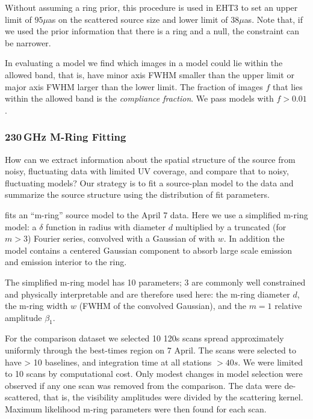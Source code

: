 Without assuming a ring prior, this procedure is used in EHT3  to set an upper limit of $95\mu$as on
the scattered source size and lower limit of $38\mu$as.
Note that, if we used the prior information that there is a ring and a null, the constraint can be narrower.

In evaluating a model we find which images in a model could lie within the allowed band, that is, have minor axis FWHM smaller than the upper limit or major axis FWHM larger than the lower limit.  The fraction of images $f$ that lies within the allowed band is the {\em compliance fraction}.  We pass models with $f > 0.01$.  

\subsubsection{230\,GHz M-Ring Fitting}

How can we extract information about the spatial structure of the source from noisy, fluctuating data with limited UV coverage, and compare that to noisy, fluctuating models? Our strategy is to fit a source-plan model to the data and summarize the source structure using the distribution of fit parameters.  

 fits an ``m-ring'' source model to the April 7 data.  Here we use a simplified m-ring model: a $\delta$ function in radius with diameter $d$ multiplied by a truncated (for $m > 3$) Fourier series, convolved with a Gaussian of with $w$.  In addition the model contains a centered Gaussian component to absorb large scale emission and emission interior to the ring.

The simplified m-ring model has 10 parameters; 3 are commonly well constrained and physically interpretable and are therefore used here: the m-ring diameter $d$, the m-ring width $w$ (FWHM of the convolved Gaussian), and the $m=1$ relative amplitude $\beta_1$.

For the comparison dataset we selected 10 120s scans spread approximately uniformly through the best-times region on 7 April.  The scans were selected to have > 10 baselines, and integration time at all stations $> 40s$.  We were limited to 10 scans by computational cost.   Only modest changes in model selection were observed if any one scan was removed from the comparison.  The data were de-scattered, that is, the visibility amplitudes were divided by the scattering kernel.  Maximum likelihood m-ring parameters were then found for each scan.

